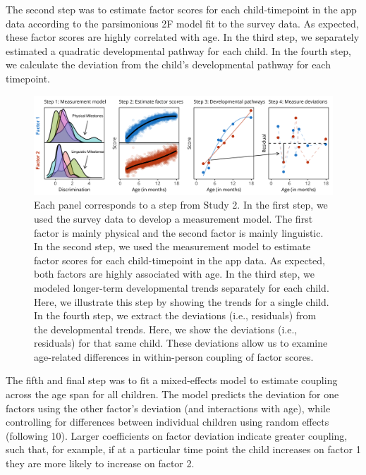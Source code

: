 \documentclass[man]{apa7}
\begin{document}

The second step was to estimate factor scores for each
child-timepoint in the app data according to the parsimonious 2F model
fit to the survey data. As expected, these factor scores are highly
correlated with age. In the third step, we separately estimated a
quadratic developmental pathway for each child. In the fourth step, we
calculate the deviation from the child's developmental pathway for each
timepoint.

\begin{figure}
\centering
\includegraphics[width=1\columnwidth]{figures/bigfigure.png}
\caption{Each panel corresponds to a step from Study 2. In the first step, we used the survey data to develop a measurement model. The first factor is mainly physical and the second factor is mainly linguistic. In the second step, we used the measurement model to estimate factor scores for each child-timepoint in the app data. As expected, both factors are highly associated with age. In the third step, we modeled longer-term developmental trends separately for each child. Here, we illustrate this step by showing the trends for a single child. In the fourth step, we extract the deviations (i.e., residuals) from the developmental trends. Here, we show the deviations (i.e., residuals) for that same child. These deviations allow us to examine age-related differences
in within-person coupling of factor scores.}
\label{fig:study2}
\end{figure}

The fifth and final step was to fit a mixed-effects model to estimate
coupling across the age span for all children. The model predicts the deviation for one factors using the other factor's deviation (and interactions with age), while controlling for differences between individual children using random effects (following 10). Larger coefficients on factor deviation indicate greater coupling, such that, for example, if at a particular time point the child increases on factor 1 they are more likely to increase on factor 2. 
\end{document}
